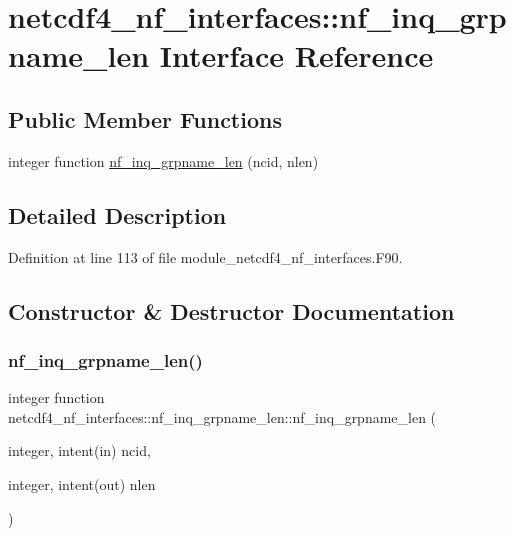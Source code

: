 \hypertarget{interfacenetcdf4__nf__interfaces_1_1nf__inq__grpname__len}{}\section{netcdf4\+\_\+nf\+\_\+interfaces\+:\+:nf\+\_\+inq\+\_\+grpname\+\_\+len Interface Reference}
\label{interfacenetcdf4__nf__interfaces_1_1nf__inq__grpname__len}
\subsection*{Public Member Functions}
\begin{DoxyCompactItemize}
\item 
integer function \hyperlink{interfacenetcdf4__nf__interfaces_1_1nf__inq__grpname__len_a7c772753eff75ea2059088c87a41be1a}{nf\+\_\+inq\+\_\+grpname\+\_\+len} (ncid, nlen)
\end{DoxyCompactItemize}


\subsection{Detailed Description}


Definition at line 113 of file module\+\_\+netcdf4\+\_\+nf\+\_\+interfaces.\+F90.



\subsection{Constructor \& Destructor Documentation}
\mbox{\label{interfacenetcdf4__nf__interfaces_1_1nf__inq__grpname__len_a7c772753eff75ea2059088c87a41be1a}} 
\subsubsection{\texorpdfstring{nf\+\_\+inq\+\_\+grpname\+\_\+len()}{nf\_inq\_grpname\_len()}}
{\footnotesize\ttfamily integer function netcdf4\+\_\+nf\+\_\+interfaces\+::nf\+\_\+inq\+\_\+grpname\+\_\+len\+::nf\+\_\+inq\+\_\+grpname\+\_\+len (\begin{DoxyParamCaption}\item[{integer, intent(in)}]{ncid,  }\item[{integer, intent(out)}]{nlen }\end{DoxyParamCaption})}



